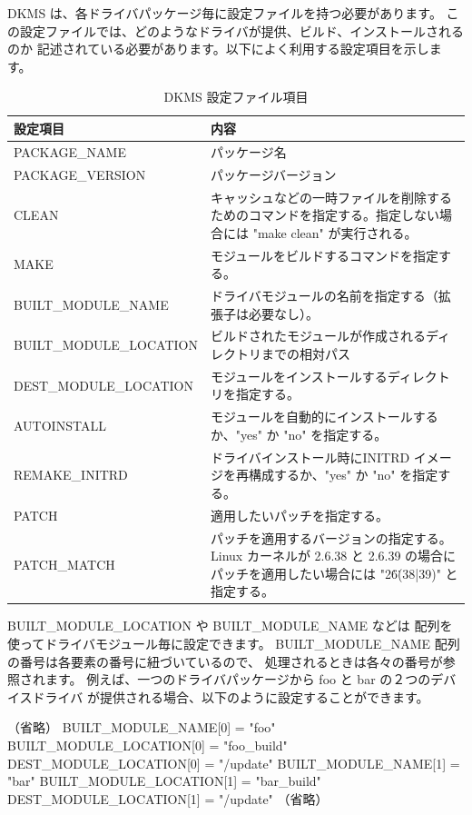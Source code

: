 \documentclass[mingoth,a4paper]{jsarticle}
\begin{document}
DKMS は、各ドライバパッケージ毎に設定ファイルを持つ必要があります。
この設定ファイルでは、どのようなドライバが提供、ビルド、インストールされるのか
記述されている必要があります。以下によく利用する設定項目を示します。
\begin{table}[ht]
 \caption{DKMS 設定ファイル項目}
 \label{tab:dkms-config-file}
\begin{center}
  \begin{tabular}{|l|p{}|}
 \hline
 設定項目 & 内容 \\
 \hline \hline
PACKAGE\_NAME & パッケージ名 \\
PACKAGE\_VERSION & パッケージバージョン \\
CLEAN & キャッシュなどの一時ファイルを削除するためのコマンドを指定する。指定しない場合には "make clean" が実行される。\\
MAKE & モジュールをビルドするコマンドを指定する。\\
BUILT\_MODULE\_NAME & ドライバモジュールの名前を指定する（拡張子は必要なし）。\\
BUILT\_MODULE\_LOCATION &  ビルドされたモジュールが作成されるディレクトリまでの相対パス\\
DEST\_MODULE\_LOCATION & モジュールをインストールするディレクトリを指定する。\\
AUTOINSTALL & モジュールを自動的にインストールするか、"yes" か "no" を指定する。\\
REMAKE\_INITRD & ドライバインストール時にINITRD イメージを再構成するか、"yes" か "no" を指定する。 \\
PATCH & 適用したいパッチを指定する。\\
PATCH\_MATCH & パッチを適用するバージョンの指定する。Linux カーネルが 2.6.38 と 2.6.39 の場合にパッチを適用したい場合には "2\.6\.(38|39)" と指定する。\\
 \hline
 \end{tabular}
\end{center}
\end{table}

BUILT\_MODULE\_LOCATION や BUILT\_MODULE\_NAME などは
配列を使ってドライバモジュール毎に設定できます。
BUILT\_MODULE\_NAME 配列の番号は各要素の番号に紐づいているので、
処理されるときは各々の番号が参照されます。
例えば、一つのドライバパッケージから foo と bar の２つのデバイスドライバ
が提供される場合、以下のように設定することができます。

\begin{commandline}
（省略）
BUILT\_MODULE\_NAME[0] = "foo"
BUILT\_MODULE\_LOCATION[0]  = "foo_build"
DEST\_MODULE\_LOCATION[0] = "/update"
BUILT\_MODULE\_NAME[1] = "bar"
BUILT\_MODULE\_LOCATION[1]  = "bar_build"
DEST\_MODULE\_LOCATION[1] = "/update"
（省略）
\end{commandline}
\end{document}
